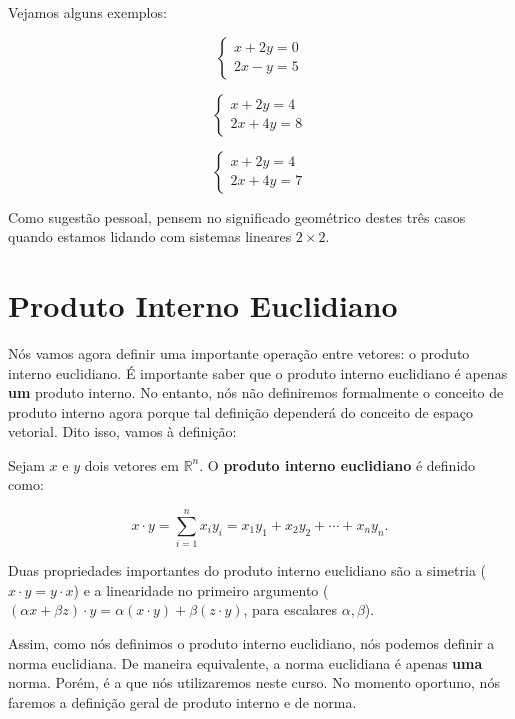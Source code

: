 Vejamos alguns exemplos:

\begin{Example}[SPD]
	$$
	\begin{cases}
		x + 2y = 0 \\
		2x - y = 5
	\end{cases}
	$$
\end{Example}

\begin{Example}[SPI]
	$$
	\begin{cases}
		x + 2y = 4 \\
		2x + 4y = 8
	\end{cases}
	$$
\end{Example}

\begin{Example}[SI]
	$$
	\begin{cases}
		x + 2y = 4 \\
		2x + 4y = 7
	\end{cases}
	$$
\end{Example}

Como sugestão pessoal, pensem no significado geométrico destes três casos quando estamos lidando com sistemas lineares $2\times 2$.

\section{Produto Interno Euclidiano}

Nós vamos agora definir uma importante operação entre vetores: o produto interno euclidiano. É importante saber que o produto interno euclidiano é apenas \textbf{um} produto interno. No entanto, nós não definiremos formalmente o conceito de produto interno agora porque tal definição dependerá do conceito de espaço vetorial. Dito isso, vamos à definição:

\begin{Definition}
	Sejam $x$ e $y$ dois vetores em $\mathbb{R}^n$. O \textbf{produto interno euclidiano} é definido como:
	
	$$
	x\cdot y = \sum\limits_{i = 1}^{n} x_iy_i = x_1y_1 + x_2y_2 + \cdots + x_ny_n.
	$$
\end{Definition}

Duas propriedades importantes do produto interno euclidiano são a simetria ($x\cdot y = y\cdot x$) e a linearidade no primeiro argumento ($(\alpha x + \beta z) \cdot y = \alpha(x\cdot y) + \beta(z\cdot y)$, para escalares $\alpha, \beta$).

Assim, como nós definimos o produto interno euclidiano, nós podemos definir a norma euclidiana. De maneira equivalente, a norma euclidiana é apenas \textbf{uma} norma. Porém, é a que nós utilizaremos neste curso. No momento oportuno, nós faremos a definição geral de produto interno e de norma.

